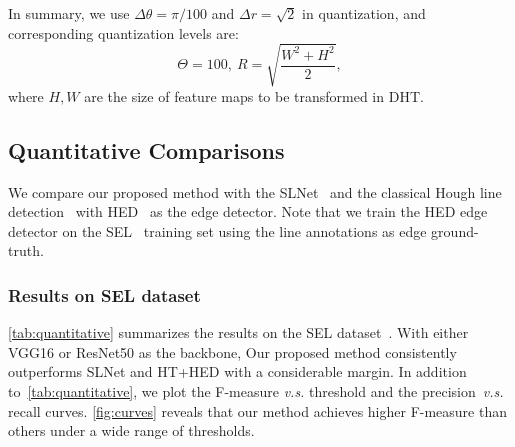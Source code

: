 \documentclass[10pt,journal,cspaper,compsoc]{IEEEtran}
\begin{document}
In summary, we use $\Delta\theta=\pi/100$ and $\Delta r = \sqrt{2}$
in quantization, and corresponding quantization levels are:
\begin{equation}
\Theta = 100, \ R = \sqrt{\frac{W^2+H^2}{2}},
\label{eq:intervals}
\end{equation}
where $H, W$ are the size of feature maps to be transformed in DHT.
\subsection{Quantitative Comparisons} \label{sec:quantitative}
We compare our proposed method with the SLNet~\cite{lee2017semantic}
and the classical Hough line detection~\cite{duda1971use} with HED~\cite{xie2015holistically}
as the edge detector.
Note that we train the HED edge detector on the SEL~\cite{lee2017semantic} training set
using the line annotations as edge ground-truth.

\subsubsection{Results on SEL dataset}
\cref{tab:quantitative} summarizes the results on the SEL dataset~\cite{lee2017semantic}.
With either VGG16 or ResNet50 as the backbone, Our proposed method consistently outperforms
SLNet and HT+HED with a considerable margin.
In addition to~\cref{tab:quantitative}, we plot the F-measure \emph{v.s.} threshold and
the precision~\emph{v.s.} recall curves.
\cref{fig:curves} reveals that our method achieves higher F-measure than others
under a wide range of thresholds.
\end{document}
